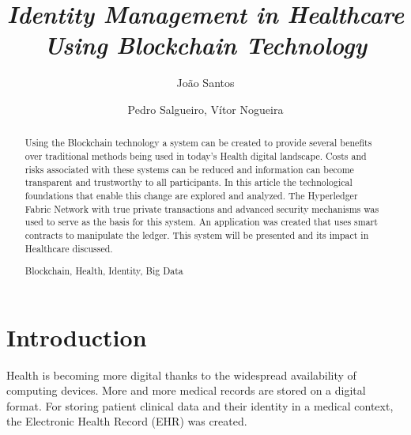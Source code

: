\documentclass[]{llncs}
\begin{document}
\title{%
\textit{Identity Management in Healthcare Using Blockchain Technology}}

\author{%
João Santos \and
Pedro Salgueiro,
Vítor Nogueira}


{\def\addcontentsline#1#2#3{}\maketitle}



\begin{abstract}
Using the Blockchain technology a system can be created to provide several benefits 
over traditional methods being used in today's Health digital landscape. 
Costs and risks associated with these systems can be reduced and information can become 
transparent and trustworthy to all participants. In this article the technological foundations 
that enable this change are explored and analyzed. The Hyperledger Fabric Network with true private 
transactions and advanced security mechanisms was used to serve as the basis for this system.
An application was created that uses smart contracts to manipulate the ledger.
This system will be presented and its impact in Healthcare discussed.

	\begin{keywords}
  		Blockchain, Health, Identity, Big Data
	\end{keywords}
\end{abstract}


\section{Introduction}

Health is becoming more digital thanks to the widespread availability of computing devices.
More and more medical records are stored on a digital format. 
For storing patient clinical data and their identity in a medical context, 
the Electronic Health Record (EHR) was created.
 
\end{document}
